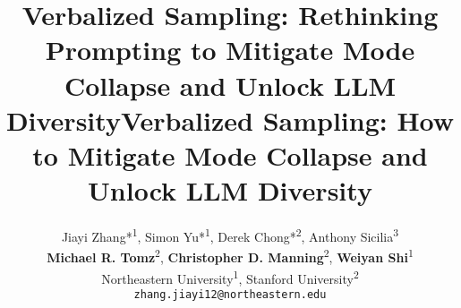 \documentclass{article} %
\title{Verbalized Sampling: Rethinking Prompting to Mitigate Mode Collapse and Unlock LLM Diversity}
\title{Verbalized Sampling: How to Mitigate Mode Collapse and Unlock LLM Diversity}
\author{Jiayi Zhang*\textsuperscript{1}, Simon Yu*\textsuperscript{1}, Derek Chong*\textsuperscript{2}, Anthony Sicilia\textsuperscript{3}\\ \textbf{Michael R. Tomz}\textsuperscript{2}, \textbf{Christopher D. Manning}\textsuperscript{2}, \textbf{Weiyan Shi}\textsuperscript{1} \\
Northeastern University\textsuperscript{1}, Stanford University\textsuperscript{2} \\
\texttt{zhang.jiayi12@northeastern.edu}
}
\theoremstyle{definition}
\theoremstyle{remark}
\theoremstyle{assumption}
\theoremstyle{lemma}
\begin{document}
\maketitle

\begin{abstract}

\end{abstract}


% 












\end{document}
